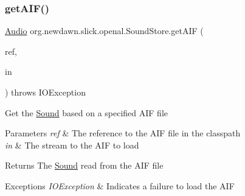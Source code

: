 \subsubsection{\texorpdfstring{get\+A\+I\+F()}{getAIF()}\hspace{0.1cm}{\footnotesize\ttfamily [3/3]}}
{\footnotesize\ttfamily \mbox{\hyperlink{interfaceorg_1_1newdawn_1_1slick_1_1openal_1_1_audio}{Audio}} org.\+newdawn.\+slick.\+openal.\+Sound\+Store.\+get\+A\+IF (\begin{DoxyParamCaption}\item[{String}]{ref,  }\item[{Input\+Stream}]{in }\end{DoxyParamCaption}) throws I\+O\+Exception\hspace{0.3cm}{\ttfamily [inline]}}

Get the \mbox{\hyperlink{classorg_1_1newdawn_1_1slick_1_1_sound}{Sound}} based on a specified A\+IF file


\begin{DoxyParams}{Parameters}
{\em ref} & The reference to the A\+IF file in the classpath \\
\hline
{\em in} & The stream to the A\+IF to load \\
\hline
\end{DoxyParams}
\begin{DoxyReturn}{Returns}
The \mbox{\hyperlink{classorg_1_1newdawn_1_1slick_1_1_sound}{Sound}} read from the A\+IF file 
\end{DoxyReturn}

\begin{DoxyExceptions}{Exceptions}
{\em I\+O\+Exception} & Indicates a failure to load the A\+IF \\
\hline
\end{DoxyExceptions}

